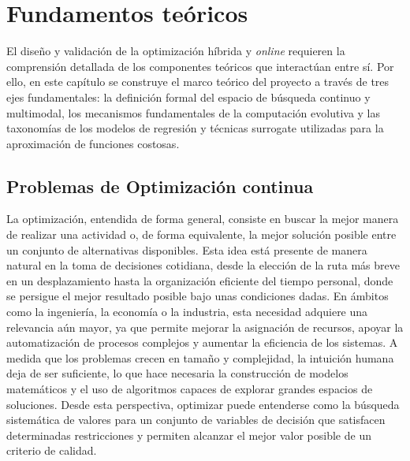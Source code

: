
\chapter{Fundamentos teóricos}
\label{chap:fundamentos_teoricos}


El diseño y validación de la optimización híbrida y \textit{online} requieren la comprensión detallada de los componentes teóricos que interactúan entre sí. Por ello, en este capítulo se construye el marco teórico del proyecto a través de tres ejes fundamentales: la definición formal del espacio de búsqueda continuo y multimodal, los mecanismos fundamentales de la computación evolutiva y las taxonomías de los modelos de regresión y técnicas surrogate utilizadas para la aproximación de funciones costosas.

\section{Problemas de Optimización continua}

La optimización, entendida de forma general, consiste en buscar la mejor manera de realizar una actividad o, de forma equivalente, la mejor solución posible entre un conjunto de alternativas disponibles. Esta idea está presente de manera natural en la toma de decisiones cotidiana, desde la elección de la ruta más breve en un desplazamiento hasta la organización eficiente del tiempo personal, donde se persigue el mejor resultado posible bajo unas condiciones dadas. En ámbitos como la ingeniería, la economía o la industria, esta necesidad adquiere una relevancia aún mayor, ya que permite mejorar la asignación de recursos, apoyar la automatización de procesos complejos y aumentar la eficiencia de los sistemas. A medida que los problemas crecen en tamaño y complejidad, la intuición humana deja de ser suficiente, lo que hace necesaria la construcción de modelos matemáticos y el uso de algoritmos capaces de explorar grandes espacios de soluciones. Desde esta perspectiva, optimizar puede entenderse como la búsqueda sistemática de valores para un conjunto de variables de decisión que satisfacen determinadas restricciones y permiten alcanzar el mejor valor posible de un criterio de calidad.

